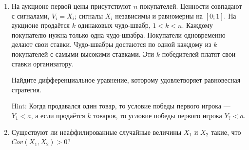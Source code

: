 \begin{enumerate}
\item На аукционе первой цены присутствуют $ n $ покупателей. Ценности совпадают с сигналами, $ V_{i}=X_{i} $; сигналы $ X_{i} $ независимы и равномерны на $ [0;1] $. На аукционе продаётся $k$ одинаковых чудо-швабр, $ 1<k<n $. Каждому покупателю нужна только одна чудо-швабра. Покупатели одновременно делают свои ставки. Чудо-швабры достаются по одной каждому из $ k $ покупателей с самыми высокими ставками. Эти $ k $ победителей платят свои ставки организатору.

Найдите дифференциальное уравнение, которому удовлетворяет равновесная стратегия.

Hint: Когда продавался один товар, то условие победы первого игрока — $ Y_{1}<a $, а если продаётся $ k $ товаров, то условие победы первого игрока $ Y_{?}<a $.

\item Существуют ли неаффилированные случайные величины $ X_{1} $ и $ X_{2} $ такие, что $Cov(X_{1},X_{2})>0  $?

\end{enumerate}
